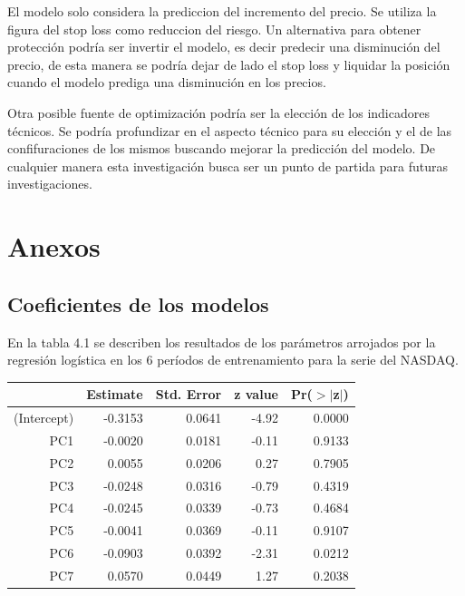\documentclass[a4paper,12pt]{Latex/Classes/PhDthesisPSnPDF}
\begin{document}
El modelo solo considera la prediccion del incremento del precio. Se utiliza la figura del stop loss como reduccion del riesgo. Un alternativa para obtener protección podría ser invertir el modelo, es decir predecir una disminución del precio, de esta manera se podría dejar de lado el stop loss y liquidar la posición cuando el modelo prediga una disminución en los precios.

Otra posible fuente de optimización podría ser la elección de los indicadores técnicos. Se podría profundizar en el aspecto técnico para su elección y el de las confifuraciones de los mismos buscando mejorar la predicción del modelo. De cualquier manera esta investigación busca ser un punto de partida para futuras investigaciones.



\chapter{Anexos}

\section{Coeficientes de los modelos}

En la tabla 4.1 se describen los resultados de los parámetros arrojados por la regresión logística en los 6 períodos de entrenamiento para la serie del NASDAQ.
\begin{center}
\begin{table}[ht]
\centering
\begin{tabular}{rrrrr}
  \hline
 & Estimate & Std. Error & z value & Pr($>$$|$z$|$) \\ 
  \hline
(Intercept) & -0.3153 & 0.0641 & -4.92 & 0.0000 \\ 
  PC1 & -0.0020 & 0.0181 & -0.11 & 0.9133 \\ 
  PC2 & 0.0055 & 0.0206 & 0.27 & 0.7905 \\ 
  PC3 & -0.0248 & 0.0316 & -0.79 & 0.4319 \\ 
  PC4 & -0.0245 & 0.0339 & -0.73 & 0.4684 \\ 
  PC5 & -0.0041 & 0.0369 & -0.11 & 0.9107 \\ 
  PC6 & -0.0903 & 0.0392 & -2.31 & 0.0212 \\ 
  PC7 & 0.0570 & 0.0449 & 1.27 & 0.2038 \\ 
   \hline
\end{tabular}
\end{table}\end{center}
\end{document}
